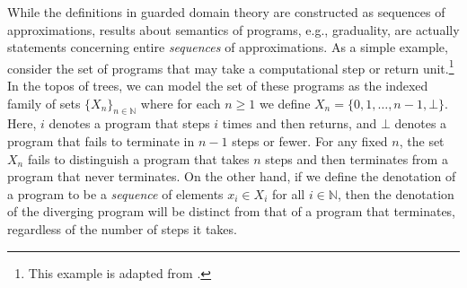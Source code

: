  While the definitions in guarded domain
theory are constructed as sequences of approximations, results about semantics
of programs, e.g., graduality, are actually statements concerning entire
\emph{sequences} of approximations. As a simple example, consider the set of
programs that may take a computational step or return unit.\footnote{This
example is adapted from \cite{mogelberg-paviotti2016}.} In the topos of trees,
we can model the set of these programs as the indexed family of sets $\{X_n\}_{n
\in \mathbb{N}}$ where for each $n \ge 1$ we define $X_n = \{0,1,\dots,n-1,
\bot\}$. Here, $i$ denotes a program that steps $i$ times and then returns, and
$\bot$ denotes a program that fails to terminate in $n-1$ steps or fewer. For
any fixed $n$, the set $X_n$ fails to distinguish a program that takes $n$ steps
and then terminates from a program that never terminates. On the other hand, if
we define the denotation of a program to be a \emph{sequence} of elements $x_i
\in X_i$ for all $i \in \mathbb{N}$, then the denotation of the diverging
program will be distinct from that of a program that terminates, regardless of
the number of steps it takes.




